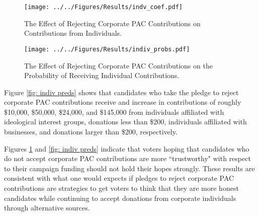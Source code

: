\documentclass[12pt]{article}
\begin{document}
\begin{figure*}[!htb]
    \centering
    \begin{subfigure}[b]{0.65\textwidth}
        \centering
        \texttt{[image: ../../Figures/Results/indv\_coef.pdf]}
        \caption{The Effect of Rejecting Corporate PAC Contributions on Contributions from Individuals.}
        \label{fig: indiv coefs}
    \end{subfigure}
    
    \begin{subfigure}[b]{0.65\textwidth}
        \centering
        \texttt{[image: ../../Figures/Results/indiv\_probs.pdf]}
        \caption{The Effect of Rejecting Corporate PAC Contributions on the Probability of Receiving Individual Contributions.}
        \label{fig: indiv probs}
    \end{subfigure}
    \caption{\textbf{The Effect of Rejecting Corporate PAC Contributions on Contributions and the Probability of Receiving Money from Individuals.} These figures present the posterior distributions estimated for a candidate that pledges to reject corporate PAC contributions. The dot shows the median coefficient estimate and the intervals show the 50\% and 89\% highest density intervals. Figure \ref{fig: indiv coefs} shows that candidates that pledge to reject corporate PAC contributions experience an increase in contributions from small-dollar, total, ideological, large-dollar, and business individual contributions. Figure \ref{fig: indiv probs} shows that rejecting corporate PAC contributions has no effect on the probability of receiving contributions from individuals affiliated with labor or ideological interest groups. See Table \ref{tbl: indiv results} for the formal estimates.}
    \label{fig: indiv results}
\end{figure*}

Figure \ref{fig: indiv preds} shows that candidates who take the pledge to reject corporate PAC contributions receive and increase in contributions of roughly \$10,000, \$50,000, \$24,000, and \$145,000 from individuals affiliated with ideological interest groups, donations less than \$200, individuals affiliated with businesses, and donations larger than \$200, respectively. 

Figures \ref{fig: indiv coefs} and \ref{fig: indiv preds} indicate that voters hoping that candidates who do not accept corporate PAC contributions are more ``trustworthy" with respect to their  campaign funding should not hold their hopes strongly. These results are consistent with what one would expects if pledges to reject corporate PAC contributions are strategies to get voters to think that they are more honest candidates while continuing to accept donations from corporate individuals through alternative sources. 
 
\end{document}
